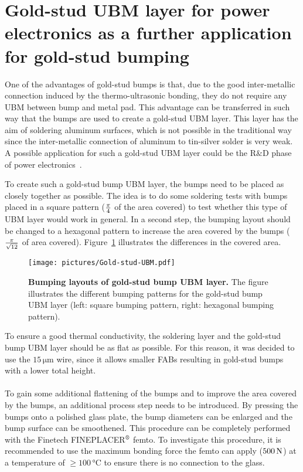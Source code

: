\section[Gold-stud Under Bump Metallization (UBM) layer for power electronics]{Gold-stud \ac{UBM} layer for power electronics as a further application for gold-stud bumping}\label{sec:UBM_layer}

One of the advantages of gold-stud bumps is that, due to the good inter-metallic connection induced by the thermo-ultrasonic bonding, they do not require any \ac{UBM} between bump and metal pad. This advantage can be transferred in such way that the bumps are used to create a gold-stud \ac{UBM} layer. This layer has the aim of soldering aluminum surfaces, which is not possible in the traditional way since the inter-metallic connection of aluminum to tin-silver solder is very weak. A possible application for such a gold-stud \ac{UBM} layer could be the R$\&$D phase of power electronics~\cite{Mei14}.

To create such a gold-stud bump \ac{UBM} layer, the bumps need to be placed as closely together as possible. The idea is to do some soldering tests with bumps placed in a square pattern ($\frac{\rm{\pi}}{4}$ of the area covered) to test whether this type of \ac{UBM} layer would work in general. In a second step, the bumping layout should be changed to a hexagonal pattern to increase the area covered by the bumps ($\frac{\rm{\pi}}{\sqrt{12}}$ of area covered). Figure~\ref{fig:gold_stud_UBM_layout} illustrates the differences in the covered area.
\begin{figure}
\begin{center}
\texttt{[image: pictures/Gold-stud-UBM.pdf]}
\end{center}
\caption[Bumping layouts of gold-stud bump UBM layer]{\textbf{Bumping layouts of gold-stud bump \ac{UBM} layer.} The figure illustrates the different bumping patterns for the gold-stud bump \ac{UBM} layer (left: square bumping pattern, right: hexagonal bumping pattern).}\label{fig:gold_stud_UBM_layout}
\end{figure}
To ensure a good thermal conductivity, the soldering layer and the gold-stud bump \ac{UBM} layer should be as flat as possible. For this reason, it was decided to use the $15\,\si{\micro \meter}$ wire, since it allows smaller \ac{FAB}s resulting in gold-stud bumps with a lower total height.\\
\\To gain some additional flattening of the bumps and to improve the area covered by the bumps, an additional process step needs to be introduced. By pressing the bumps onto a polished glass plate, the bump diameters can be enlarged and the bump surface can be smoothened. This procedure can be completely performed with the Finetech FINEPLACER$\rm{\symbR}$ femto. To investigate this procedure, it is recommended to use the maximum bonding force the femto can apply ($500\,\rm{N}$) at a temperature of $\geq 100\,\si{\degreeCelsius}$ to ensure there is no connection to the glass.


